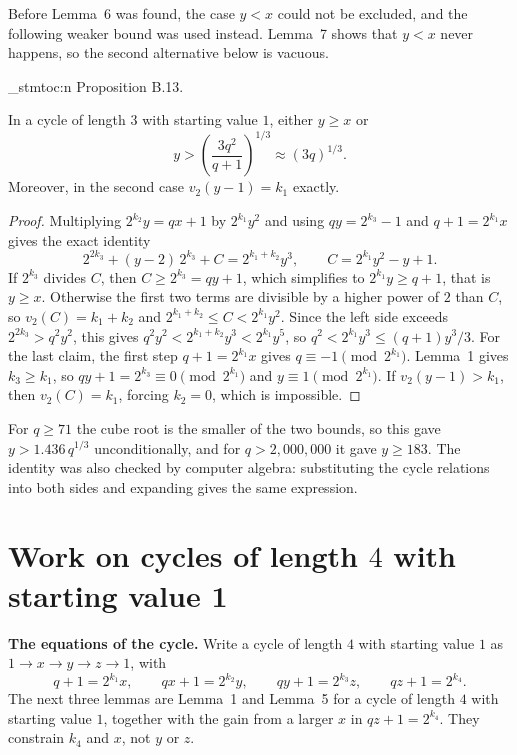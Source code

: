 \documentclass[11pt]{article}
\newenvironment{named}[1]{%
  \par\addvspace{\medskipamount}%
  \pagebreak[3]%
  \noindent{\bfseries #1}\space\ignorespaces
  \stmtoc{#1}%
}{\par\addvspace{\medskipamount}}
\newcommand{\topic}[1]{\par\noindent\textbf{#1}}
\newcommand{\stmtoc}[1]{ \qn_stmtoc:n {#1} }
\begin{document}
Before Lemma~6 was found, the case $y < x$ could not be excluded, and the following weaker bound was used instead.
Lemma~7 shows that $y < x$ never happens, so the second alternative below is vacuous.

\begin{named}{Proposition B.13.}
In a cycle of length $3$ with starting value $1$, either $y \ge x$ or
\[
y > \left( \frac{3q^2}{q+1} \right)^{1/3} \approx (3q)^{1/3}.
\]
Moreover, in the second case $v_2(y-1) = k_1$ exactly.
\end{named}

\begin{proof}
Multiplying $2^{k_2} y = qx + 1$ by $2^{k_1} y^2$ and using $qy = 2^{k_3} - 1$ and $q + 1 = 2^{k_1} x$ gives the exact identity
\[
2^{2k_3} + (y-2)\, 2^{k_3} + C = 2^{k_1+k_2} y^3,
\qquad
C = 2^{k_1} y^2 - y + 1.
\]
If $2^{k_3}$ divides $C$, then $C \ge 2^{k_3} = qy + 1$, which simplifies to $2^{k_1} y \ge q + 1$, that is $y \ge x$.
Otherwise the first two terms are divisible by a higher power of $2$ than $C$, so $v_2(C) = k_1 + k_2$ and $2^{k_1+k_2} \le C < 2^{k_1} y^2$.
Since the left side exceeds $2^{2k_3} > q^2 y^2$, this gives $q^2 y^2 < 2^{k_1+k_2} y^3 < 2^{k_1} y^5$, so $q^2 < 2^{k_1} y^3 \le (q+1) y^3 / 3$.
For the last claim, the first step $q + 1 = 2^{k_1} x$ gives $q \equiv -1 \pmod{2^{k_1}}$.
Lemma~1 gives $k_3 \ge k_1$, so $qy + 1 = 2^{k_3} \equiv 0 \pmod{2^{k_1}}$ and $y \equiv 1 \pmod{2^{k_1}}$.
If $v_2(y-1) > k_1$, then $v_2(C) = k_1$, forcing $k_2 = 0$, which is impossible.
\end{proof}

For $q \ge 71$ the cube root is the smaller of the two bounds, so this gave $y > 1.436\, q^{1/3}$ unconditionally, and for $q > 2{,}000{,}000$ it gave $y \ge 183$.
The identity was also checked by computer algebra: substituting the cycle relations into both sides and expanding gives the same expression.

\section{Work on cycles of length $4$ with starting value 1}
\label{app:four}

\topic{The equations of the cycle.}
Write a cycle of length $4$ with starting value $1$ as $1 \to x \to y \to z \to 1$, with
\[
q + 1 = 2^{k_1} x, \qquad qx + 1 = 2^{k_2} y, \qquad qy + 1 = 2^{k_3} z, \qquad qz + 1 = 2^{k_4}.
\]
The next three lemmas are Lemma~1 and Lemma~5 for a cycle of length $4$ with starting value $1$, together with the gain from a larger $x$ in $qz + 1 = 2^{k_4}$. They constrain $k_4$ and $x$, not $y$ or $z$.
\end{document}
